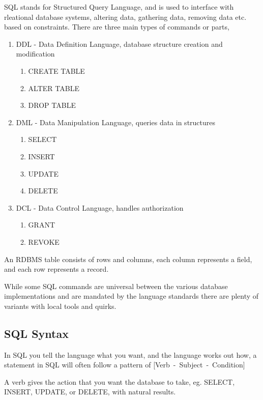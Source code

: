 \documentclass[10pt, english]{article}
\begin{document}
SQL stands for Structured Query Language, and is used to interface with rleational database systems, altering data,
gathering data, removing data etc. based on constraints. There are three main types of commands or parts, 
\begin{enumerate}
    \item DDL - Data Definition Language, database structure creation and modification
        \begin{enumerate}\tiny
            \item CREATE TABLE
            \item ALTER TABLE
            \item DROP TABLE
        \end{enumerate}
    \item DML - Data Manipulation Language, queries data in structures 
        \begin{enumerate}\tiny
            \item SELECT
            \item INSERT
            \item UPDATE 
            \item DELETE
        \end{enumerate}
    \item DCL - Data Control Language, handles authorization
        \begin{enumerate}\tiny
            \item GRANT
            \item REVOKE
        \end{enumerate}
\end{enumerate}

An RDBMS table consists of rows and columns, each column represents
a field, and each row represents a record. 

While some SQL commands are universal between the various database implementations 
and are mandated by the language standards there are plenty of variants with local 
tools and quirks.

\subsection{SQL Syntax}
In SQL you tell the language what you want, and the language works out how,
a statement in SQL will often follow a pattern of [Verb~-~Subject~-~Condition]

A verb gives the action that you want the database to take, eg. SELECT, INSERT, UPDATE, or DELETE,
with natural results.
\end{document}
